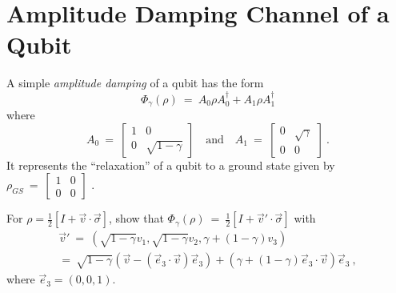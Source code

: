 \documentclass[12pt]{amsart}
\numberwithin{equation}{section}
\numberwithin{figure}{section}
\theoremstyle{theorem}
\begin{document}
\section{Amplitude Damping Channel of a Qubit}
A simple \emph{amplitude damping} of a qubit has the form
\begin{equation}\label{eq:ADChannel}
	\Phi_\gamma(\rho) \ = \ A_0 \rho A_0^\dagger + A_1 \rho A_1^\dagger 
\end{equation}
where 
\begin{equation}\label{eq:simpleAs}
	A_0 \ = \ \begin{bmatrix}
	1 & 0 \\ 0 & \sqrt{1-\gamma}
\end{bmatrix} \quad \text{and} \quad A_1 \ = \ \begin{bmatrix}
0 & \sqrt{\gamma} \\ 0 & 0 
\end{bmatrix} \ . 
\end{equation}
It represents the ``relaxation'' of a qubit to a ground state given by 
$\rho_{GS} \ = \ \left[ \begin{smallmatrix}
	1 & 0 \\ 0 & 0 
\end{smallmatrix}\right] $ .  
\begin{exer}	
For $\rho = \frac{1}{2} [I +\vec{v}\cdot \vec{\sigma}]$, show that 
$\Phi_\gamma(\rho) \ = \ \frac{1}{2} [I +\vec{v}'\cdot \vec{\sigma}]$ with
\begin{multline*}
	\vec{v}' \ = \  \left(\sqrt{1-\gamma} v_1, \sqrt{1-\gamma}v_2 , \gamma + 
(1-\gamma)v_3\right) \\ = \ \sqrt{1-\gamma}(\vec{v} - (\vec{e}_3\cdot \vec{v}) 
\vec{e}_3) + (\gamma+ (1-\gamma) \vec{e}_3\cdot \vec{v}) \vec{e}_3 \ ,
\end{multline*}
where $\vec{e}_3=(0,0,1)$.
\end{exer}
\end{document}
